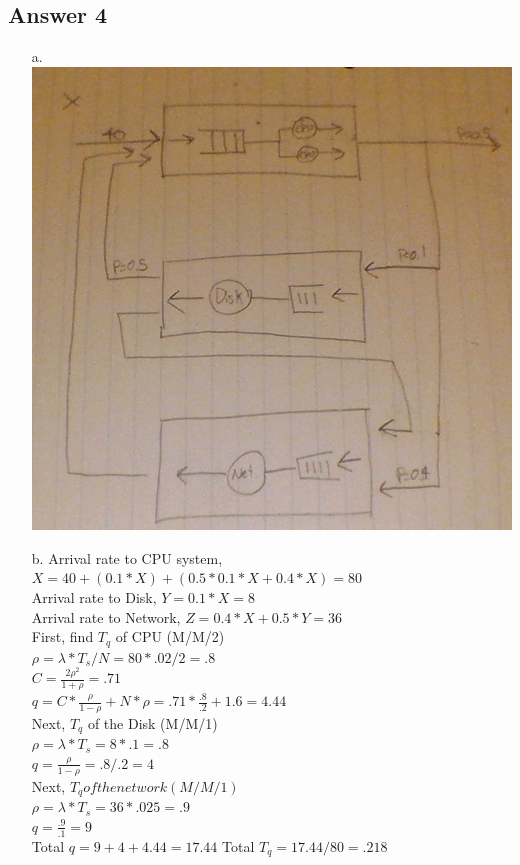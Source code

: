 \documentclass[11pt]{article}
\theoremstyle{definition}
\begin{document}
\begin{enumerate}
\section*{Answer 4}
\begin{enumerate}
	\item[a.] \includegraphics*[scale=0.5]{q4a.jpg}
	\item[b.] Arrival rate to CPU system, $X = 40 + (0.1*X) + (0.5 * 0.1 * X + 0.4*X) = 80$\\
	Arrival rate to Disk, $Y = 0.1*X = 8$\\
	Arrival rate to Network, $Z = 0.4*X + 0.5*Y = 36$\\
	\newline
	First, find $T_q$ of CPU (M/M/2)\\
	$\rho = \lambda * T_s / N = 80 * .02 / 2 = .8$\\
	$C = \frac{2\rho^2}{1 + \rho} = .71$\\
	$q = C * \frac{\rho}{1 - \rho} + N*\rho = .71 * \frac{.8}{.2} + 1.6 = 4.44$\\
	\newline
	Next, $T_q$ of the Disk (M/M/1)\\
	$\rho = \lambda * T_s = 8 * .1 = .8$\\
	$q = \frac{\rho}{1 - \rho} = .8 / .2 = 4$\\
	\newline
	Next, $T_q of the network (M/M/1)$\\
	$\rho = \lambda * T_s = 36 * .025 = .9$\\
	$q = \frac{.9}{.1} = 9$\\
	\newline
	Total $q = 9 + 4 + 4.44 = 17.44$
	Total $T_q = 17.44 / 80 = .218$
	

\end{enumerate}
\end{enumerate}
\end{document}
